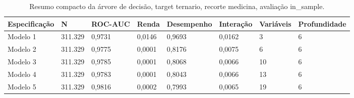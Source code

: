 \begin{table}
\caption{Resumo compacto da árvore de decisão, target ternario, recorte medicina, avaliação in_sample.}
\label{tab:tabela_compacta_treeClassification_ternario_recorte_medicina_in_sample}
\begin{tabular}{llllllll}
\toprule
Especificação & N & ROC-AUC & Renda & Desempenho & Interação & Variáveis & Profundidade \\
\midrule
Modelo 1 & 311.329 & 0,9731 & 0,0146 & 0,9693 & 0,0162 & 3 & 6 \\
Modelo 2 & 311.329 & 0,9775 & 0,0001 & 0,8176 & 0,0075 & 6 & 6 \\
Modelo 3 & 311.329 & 0,9785 & 0,0001 & 0,8068 & 0,0066 & 10 & 6 \\
Modelo 4 & 311.329 & 0,9783 & 0,0001 & 0,8043 & 0,0066 & 13 & 6 \\
Modelo 5 & 311.329 & 0,9816 & 0,0002 & 0,7993 & 0,0065 & 19 & 6 \\
\bottomrule
\end{tabular}
\end{table}
